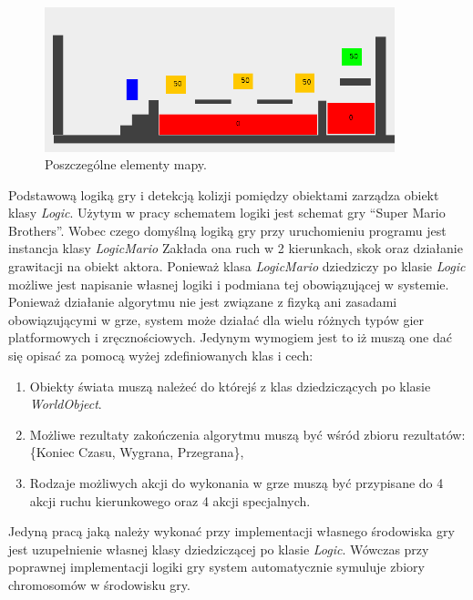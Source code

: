 \begin{par}
	\begin{figure}[!h]
		\centering
		\includegraphics[width=4in]{obrazki/objects.png}
		\caption{Poszczególne elementy mapy.}
		\label{fig:objects}
	\end{figure}
\end{par}

\begin{par}
	Podstawową logiką gry i detekcją kolizji pomiędzy obiektami zarządza obiekt klasy \textit{Logic}. Użytym w pracy schematem logiki jest schemat gry ``Super Mario Brothers''. Wobec czego domyślną logiką gry przy uruchomieniu programu jest instancja klasy \textit{LogicMario}
	Zakłada ona ruch w 2 kierunkach, skok oraz działanie grawitacji na obiekt aktora.
	Ponieważ klasa \textit{LogicMario} dziedziczy po klasie \textit{Logic} możliwe jest napisanie własnej logiki i podmiana tej obowiązującej w systemie.
	Ponieważ działanie algorytmu nie jest związane z fizyką ani zasadami obowiązującymi w grze, system może działać dla wielu różnych typów gier platformowych i zręcznościowych.
	Jedynym wymogiem jest to iż muszą one dać się opisać za pomocą wyżej zdefiniowanych klas i cech:
	\begin{enumerate}
		\item
			Obiekty świata muszą należeć do którejś z klas dziedziczących po klasie \textit{WorldObject}.
		\item 
			Możliwe rezultaty zakończenia algorytmu muszą być wśród zbioru rezultatów: \{Koniec Czasu, Wygrana, Przegrana\}, 
		\item
			Rodzaje możliwych akcji do wykonania w grze muszą być przypisane do 4 akcji ruchu kierunkowego oraz 4 akcji specjalnych.
	\end{enumerate}

	Jedyną pracą jaką należy wykonać przy implementacji własnego środowiska gry jest uzupełnienie własnej klasy dziedziczącej po klasie \textit{Logic}.
	Wówczas przy poprawnej implementacji logiki gry system automatycznie symuluje zbiory chromosomów w środowisku gry.
\end{par}
